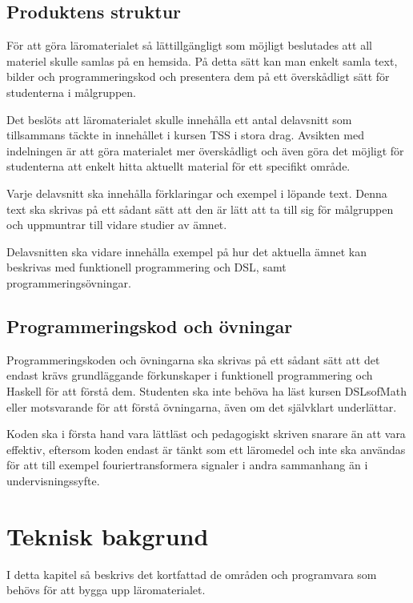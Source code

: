 \documentclass[]{article}
\begin{document}
\subsection{Produktens struktur}
För att göra läromaterialet så lättillgängligt som möjligt beslutades att
all materiel skulle samlas på en hemsida. På detta sätt kan man enkelt
samla text, bilder och programmeringskod och presentera dem på ett
överskådligt sätt för studenterna i målgruppen.

Det beslöts att läromaterialet skulle innehålla ett antal delavsnitt som
tillsammans täckte in innehållet i kursen TSS i stora drag.
Avsikten med indelningen är att göra materialet mer överskådligt och
även göra det möjligt för studenterna att enkelt hitta aktuellt material
för ett specifikt område.

Varje delavsnitt ska innehålla förklaringar och exempel i löpande text.
Denna text ska skrivas på ett sådant sätt att den är lätt att ta till
sig för målgruppen och uppmuntrar till vidare studier av ämnet.

Delavsnitten ska vidare innehålla exempel på hur det aktuella ämnet kan
beskrivas med funktionell programmering och DSL, samt programmeringsövningar.

\subsection{Programmeringskod och övningar}

Programmeringskoden och övningarna ska skrivas på ett sådant sätt att det endast krävs grundläggande förkunskaper i
funktionell programmering och Haskell för att förstå dem. Studenten ska inte behöva ha läst kursen DSLsofMath eller
motsvarande för att förstå övningarna, även om det självklart underlättar.

Koden ska i första hand vara lättläst och pedagogiskt skriven snarare än att vara effektiv, eftersom koden endast är
tänkt som ett läromedel och inte ska användas för att till exempel fouriertransformera signaler i andra sammanhang än i
undervisningssyfte.


\section{Teknisk bakgrund}
I detta kapitel så beskrivs det kortfattad de områden och programvara som
behövs för att bygga upp läromaterialet.
\end{document}
